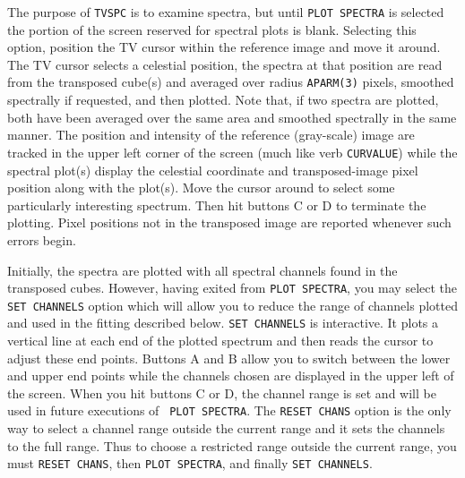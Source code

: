 \documentclass[twoside]{article}
\begin{document}
The purpose of {\tt TVSPC} is to examine spectra, but until {\tt PLOT
  SPECTRA} is selected the portion of the screen reserved for spectral
plots is blank.  Selecting this option, position the TV cursor within
the reference image and move it around.  The TV cursor selects a
celestial position, the spectra at that position are read from the
transposed cube(s) and averaged over radius {\tt APARM(3)} pixels,
smoothed spectrally if requested, and then plotted.  Note that, if two
spectra are plotted, both have been averaged over the same area and
smoothed spectrally in the same manner.  The position and intensity of
the reference (gray-scale) image are tracked in the upper left corner
of the screen (much like verb {\tt CURVALUE}) while the spectral
plot(s) display the celestial coordinate and transposed-image pixel
position along with the plot(s).  Move the cursor around to select
some particularly interesting spectrum.  Then hit buttons C or D to
terminate the plotting.  Pixel positions not in the transposed image
are reported whenever such errors begin.

Initially, the spectra are plotted with all spectral channels found in
the transposed cubes.  However, having exited from {\tt PLOT SPECTRA},
you may select the {\tt SET CHANNELS} option which will allow you to
reduce the range of channels plotted and used in the fitting described
below.  {\tt SET CHANNELS} is interactive.  It plots a vertical line at
each end of the plotted spectrum and then reads the cursor to adjust
these end points.  Buttons A and B allow you to switch between the
lower and upper end points while the channels chosen are displayed in
the upper left of the screen.  When you hit buttons C or D, the
channel range is set and will be used in future executions of {\tt
  PLOT SPECTRA}\@.  The {\tt RESET CHANS} option is the only way to
select a channel range outside the current range and it sets the
channels to the full range.  Thus to choose a restricted range outside
the current range, you must {\tt RESET CHANS}, then {\tt PLOT
  SPECTRA}, and finally {\tt SET CHANNELS}\@.
\end{document}
